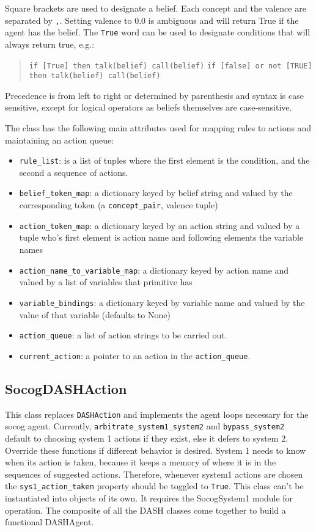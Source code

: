 \documentclass[11pt, a4paper]{article}
\begin{document}
Square brackets are used to designate a belief. Each concept and the valence are separated by \texttt{,}. Setting valence to 0.0 is ambiguous and will return True if the agent has the belief. The \texttt{True} word can be used to designate conditions that will always return true, e.g.:

\begin{quote}
\texttt{if [True] then talk(belief) call(belief)}
\texttt{if [false] or not [TRUE] then talk(belief) call(belief)}
\end{quote}

Precedence is from left to right or determined by parenthesis and syntax is case sensitive, except for logical operators as beliefs themselves are case-sensitive.

The class has the following main attributes used for mapping rules to actions and maintaining an action queue:

\begin{itemize}
    \item \texttt{rule\_list}: is a list of tuples where the first element is the condition, and the second a sequence of actions.
    \item \texttt{belief\_token\_map}: a dictionary keyed by belief string and valued by the corresponding token (a \texttt{concept\_pair}, valence tuple)
    \item \texttt{action\_token\_map}: a dictionary keyed by an action string and valued by a tuple who's first element is action name and following elements the variable names
    \item \texttt{action\_name\_to\_variable\_map}: a dictionary keyed by action name and valued by a list of variables that primitive has
    \item \texttt{variable\_bindings}: a dictionary keyed by variable name and valued by the value of that variable (defaults to None)
    \item \texttt{action\_queue}: a list of action strings to be carried out.
    \item \texttt{current\_action}: a pointer to an action in the \texttt{action\_queue}.
\end{itemize}

\subsection{SocogDASHAction}

This class replaces \texttt{DASHAction} and implements the agent loops necessary for the socog agent. Currently, \texttt{arbitrate\_system1\_system2} and \texttt{bypass\_system2} default to choosing system 1 actions if they exist, else it defers to system 2. Override these functions if different behavior is desired. System 1 needs to know when its action is taken, because it keeps a memory of where it is in the sequences of suggested actions. Therefore, whenever system1 actions are chosen the \texttt{sys1\_action\_taken} property should be toggled to \texttt{True}. This class can't be instantiated into objects of its own. It requires the SocogSystem1 module for operation. The composite of all the DASH classes come together to build a functional DASHAgent.
\end{document}
